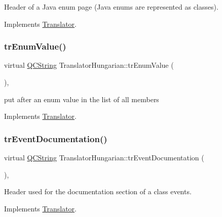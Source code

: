 Header of a Java enum page (Java enums are represented as classes). 

Implements \mbox{\hyperlink{class_translator}{Translator}}.

\mbox{\label{class_translator_hungarian_a065422acd5dab75ef92a6ea1bba93f44}} 
\subsubsection{\texorpdfstring{trEnumValue()}{trEnumValue()}}
{\footnotesize\ttfamily virtual \mbox{\hyperlink{class_q_c_string}{Q\+C\+String}} Translator\+Hungarian\+::tr\+Enum\+Value (\begin{DoxyParamCaption}{ }\end{DoxyParamCaption})\hspace{0.3cm}{\ttfamily [inline]}, {\ttfamily [virtual]}}

put after an enum value in the list of all members 

Implements \mbox{\hyperlink{class_translator}{Translator}}.

\mbox{\label{class_translator_hungarian_a7e2ff7285e25701209ed451d0a49f71d}} 
\subsubsection{\texorpdfstring{trEventDocumentation()}{trEventDocumentation()}}
{\footnotesize\ttfamily virtual \mbox{\hyperlink{class_q_c_string}{Q\+C\+String}} Translator\+Hungarian\+::tr\+Event\+Documentation (\begin{DoxyParamCaption}{ }\end{DoxyParamCaption})\hspace{0.3cm}{\ttfamily [inline]}, {\ttfamily [virtual]}}

Header used for the documentation section of a class\textquotesingle{} events. 

Implements \mbox{\hyperlink{class_translator}{Translator}}.

\mbox{\label{class_translator_hungarian_accfe6d26e92732e1ebc13b4ecbf65c8d}} 
